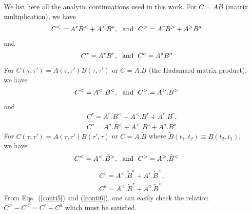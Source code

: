 \documentclass[aps,prb,superscriptaddress]{revtex4-2}
\begin{document}
We list here all the analytic continuations used in this work.  For $C = AB$ (matrix multiplication), we have\cite{jauho}
\begin{gather}
C^< = A^r B^< + A^< B^a, ~~ {\rm and } ~~ C^> = A^r B^> + A^> B^a \label{conti1}
\end{gather}
and
\begin{gather}
C^r = A^r B^r , ~~ {\rm and } ~~ C^a =  A^a B^a \label{conti2}
\end{gather}
For $C(\tau,\tau') = A(\tau,\tau') B(\tau,\tau')$ or $C=A.B$ (the Hadamard matrix product), we have\cite{jauho}
\begin{gather}
C^< = A^<. B^< , ~~ {\rm and } ~~ C^> = A^> .B^> \label{conti3}
\end{gather}
and
\begin{eqnarray}
&&C^r = A^r .B^< + A^< .B^r + A^r .B^r, \nonumber \\
&& C^a = A^a .B^< + A^< .B^a + A^a. B^a \label{conti4}
\end{eqnarray}
For $C(\tau,\tau') = A(\tau,\tau') B(\tau',\tau)$ or $C = A.{\tilde B}$ where ${\tilde B}(t_1,t_2) \equiv B(t_2,t_1)$, we have\cite{jauho}
\begin{gather}
C^< = A^< .{\tilde B}^> , ~~ {\rm and } ~~ C^> = A^> .{\tilde B}^< \label{conti5}
\end{gather}
\begin{eqnarray}
&& C^r = A^< .{\tilde B}^a + A^r .{\tilde B}^< , \nonumber \\
&& C^a = A^< .{\tilde B}^r + A^a .{\tilde B}^<  \label{conti6}
\end{eqnarray}
From Eqs.~(\ref{conti5}) and (\ref{conti6}), one can easily check the relation $C^> - C^< = C^r - C^a$ which must be satisfied.
\end{document}
